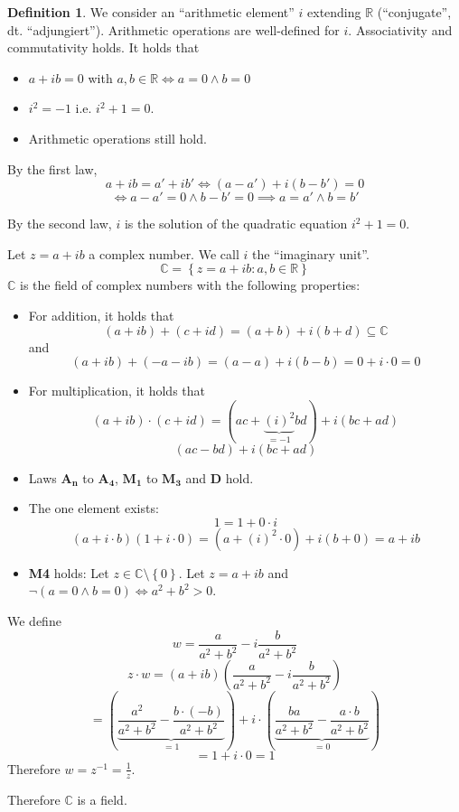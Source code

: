 \documentclass[a4paper,landscape,twocolumn]{article}
\theoremstyle{definition}
\newtheorem{defi}{Definition}
\newcommand\set[1]{\left\{#1\right\}}
\begin{document}
\begin{defi}
  We consider an \enquote{arithmetic element} $i$ extending $\mathbb R$
  (\enquote{conjugate}, dt. \enquote{\foreignlanguage{ngerman}{adjungiert}}).
  Arithmetic operations are well-defined for $i$. Associativity and commutativity holds.
  It holds that
  \begin{itemize}
    \item $a + ib = 0$ with $a,b \in \mathbb R \iff a = 0 \land b = 0$
    \item $i^2 = -1$ i.e. $i^2 + 1 = 0$.
    \item Arithmetic operations still hold.
  \end{itemize}

  By the first law,
  \[
    a + ib = a' + ib' \iff (a - a') + i(b - b') = 0
  \] \[
    \iff a - a' = 0 \land b - b' = 0
    \implies a = a' \land b = b'
  \]

  By the second law, $i$ is the solution of the quadratic equation $i^2 + 1 = 0$.

  Let $z = a + ib$ a complex number. We call $i$ the \enquote{imaginary unit}.
  \[ \mathbb C = \set{z = a + ib : a,b \in \mathbb R} \]
  $\mathbb C$ is the field of complex numbers with the following properties:
  \begin{itemize}
    \item For addition, it holds that
      \[ (a + ib) + (c + id) = (a + b) + i (b + d) \subseteq \mathbb C \]
      and
      \[ (a + ib) + (-a - ib) = (a - a) + i(b - b) = 0 + i \cdot 0 = 0 \]
    \item For multiplication, it holds that
      \[ (a + ib) \cdot (c + id) = (ac + \underbrace{(i)^2}_{=-1} b d) + i (bc + ad) \]
      \[ (ac - bd) + i (bc + ad) \]
    \item Laws $\mathbf{A_n}$ to $\mathbf{A_4}$, $\mathbf{M_1}$ to $\mathbf{M_3}$ and $\mathbf{D}$ hold.
    \item The one element exists:
      \[ 1 = 1 + 0 \cdot i \]
      \[ (a + i \cdot b) (1 + i \cdot 0) = (a + (i)^2 \cdot 0) + i (b + 0) = a + ib \]
    \item \textbf{M4} holds: Let $z \in \mathbb C \setminus \set{0}$.
      Let $z = a + ib$ and $\neg(a = 0 \land b = 0) \iff a^2 + b^2 > 0$.
  \end{itemize}

  We define
  \[ w = \frac{a}{a^2 + b^2} - i \frac{b}{a^2 + b^2} \]
  \[ z \cdot w = \left(a + ib\right) \left(\frac{a}{a^2 + b^2} - i \frac{b}{a^2 + b^2}\right) \]
  \[
      = \left(\underbrace{\frac{a^2}{a^2 + b^2} - \frac{b \cdot (-b)}{a^2 + b^2}}_{=1}\right)
      + i \cdot \left(\underbrace{\frac{ba}{a^2 + b^2} - \frac{a\cdot b}{a^2 + b^2}}_{=0}\right)
  \] \[
    = 1 + i \cdot 0 = 1
  \]
  Therefore $w = z^{-1} = \frac1z$.

  Therefore $\mathbb C$ is a field.
\end{defi}
\end{document}

